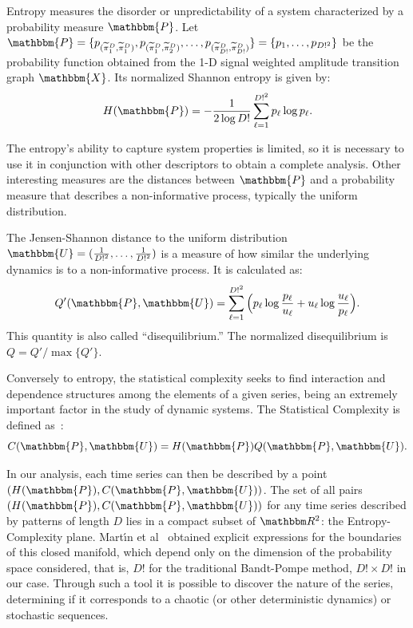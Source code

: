 \documentclass[journal]{IEEEtran}
\begin{document}
	Entropy measures the disorder or unpredictability of a system characterized by a probability measure $\mathbbm{P}$.
	Let $\mathbbm{P} = \{p_{(\widetilde\pi^D_1, \widetilde\pi^D_1)}, p_{(\widetilde\pi^D_1, \widetilde\pi^D_2)}, \dots, p_{(\widetilde\pi^D_{D!}, \widetilde\pi^D_{D!})} \} = \{p_1,\dots,p_{D!^2}\}$ be the probability function obtained from the \mbox{1-D} signal weighted amplitude transition graph $\mathbbm{X}$.
	Its normalized Shannon entropy is given by:	
	\begin{equation}
	H(\mathbbm{P}) = -\frac1{2\log D!}\sum_{\ell=1}^{D!^2} p_{\ell} \log p_{\ell} .
	\label{eq:Entropia}
	\end{equation}
	
	The entropy's ability to capture system properties is limited, so it is necessary to use it in conjunction with other des\-criptors to obtain a complete analysis.
	Other interesting measures are the distances between $\mathbbm{P}$ and a probability measure that describes a non-informative process, typically the uniform distribution.
	
	The Jensen-Shannon distance to the uniform distribution $\mathbbm{U} = (\frac{1}{D!^2}, \dots, \frac{1}{D!^2})$ is a measure of how similar the underlying dynamics is to a non-informative process.
	It is calculated as:
	\begin{equation}
	Q'(\mathbbm{P}, \mathbbm{U}) = \sum_{\ell=1}^{D!^2} \Big(p_\ell \log\frac{p_\ell}{u_\ell} +
	u_\ell \log\frac{u_\ell}{p_\ell}
	\Big).
	\end{equation}
	This quantity is also called ``disequilibrium.''
	The normalized disequilibrium is $ Q=Q'/\max\{Q'\}$.
	
	Conversely to entropy, the statistical complexity seeks to find interaction and dependence structures among the elements of a given series, being an extremely important factor in the study of dynamic systems.
	The Statistical Complexity is defined as~\cite{Lamberti2004Entropic}:
	\begin{equation}
	C(\mathbbm{P}, \mathbbm{U}) = H(\mathbbm{P}) Q(\mathbbm{P}, \mathbbm{U}).
	\end{equation}
	
	In our analysis, each time series can then be described by a point $(H(\mathbbm{P}), C(\mathbbm{P}, \mathbbm{U}))$.
	The set of all pairs $(H(\mathbbm{P}), C(\mathbbm{P}, \mathbbm{U}))$ for any time series described by patterns of length $D$ lies in a compact subset of $\mathbbm R^2$: the Entropy-Complexity plane.
	Mart\'{\i}n et al~\cite{martin2006generalized} obtained explicit expressions for the boundaries of this closed manifold, which depend only on the dimension of the probability space considered, that is, $D!$ for the traditional Bandt-Pompe method,
	$D! \times D!$ in our case.
	Through such a tool it is possible to discover the nature of the series, determining if it corresponds to a chaotic (or other deterministic dynamics) or stochastic sequences.
	
\end{document}
